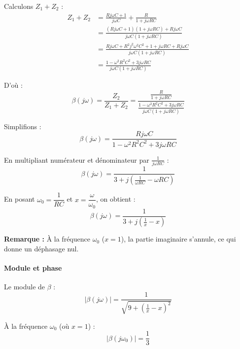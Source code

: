 \documentclass[11pt,a4paper]{article}
\begin{document}
Calculons $Z_1 + Z_2$ :
\begin{align}
Z_1 + Z_2 &= \frac{Rj\omega C + 1}{j\omega C} + \frac{R}{1 + j\omega RC} \\
&= \frac{(Rj\omega C + 1)(1 + j\omega RC) + Rj\omega C}{j\omega C(1 + j\omega RC)} \\
&= \frac{Rj\omega C + R^2j^2\omega^2C^2 + 1 + j\omega RC + Rj\omega C}{j\omega C(1 + j\omega RC)} \\
&= \frac{1 - \omega^2R^2C^2 + 3j\omega RC}{j\omega C(1 + j\omega RC)}
\end{align}

D'où :
\begin{equation}
\beta(j\omega) = \frac{Z_2}{Z_1 + Z_2} = \frac{\frac{R}{1 + j\omega RC}}{\frac{1 - \omega^2R^2C^2 + 3j\omega RC}{j\omega C(1 + j\omega RC)}}
\end{equation}

Simplifions :
\begin{equation}
\beta(j\omega) = \frac{Rj\omega C}{1 - \omega^2R^2C^2 + 3j\omega RC}
\end{equation}

En multipliant numérateur et dénominateur par $\frac{1}{j\omega RC}$ :
\begin{equation}
\beta(j\omega) = \frac{1}{3 + j\left(\frac{1}{\omega RC} - \omega RC\right)}
\end{equation}

En posant $\omega_0 = \dfrac{1}{RC}$ et $x = \dfrac{\omega}{\omega_0}$, on obtient :
\begin{equation}
\boxed{\beta(j\omega) = \frac{1}{3 + j\left(\frac{1}{x} - x\right)}}
\end{equation}

\textbf{Remarque :} À la fréquence $\omega_0$ ($x = 1$), la partie imaginaire s'annule, ce qui donne un déphasage nul.

\paragraph{Module et phase}

Le module de $\beta$ :
\begin{equation}
|\beta(j\omega)| = \frac{1}{\sqrt{9 + \left(\frac{1}{x} - x\right)^2}}
\end{equation}

À la fréquence $\omega_0$ (où $x=1$) :
\begin{equation}
\boxed{|\beta(j\omega_0)| = \frac{1}{3}}
\end{equation}
\end{document}
